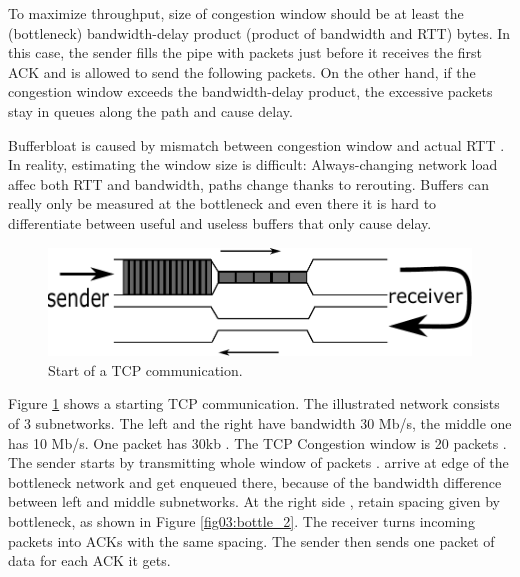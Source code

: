 To maximize throughput, size of congestion window should be at least the (bottleneck) bandwidth-delay product (product of bandwidth and RTT) bytes.  In this  case, the sender fills the pipe with packets just before it receives the first ACK and is allowed to send the following packets. On the other hand, if the congestion window exceeds the bandwidth-delay product, the excessive packets stay in queues along the path and cause delay. 


Bufferbloat is caused by  mismatch between  congestion window and actual RTT \cite{CoDel}. In reality, estimating the window size is difficult: Always-changing network load affec both RTT and bandwidth,  paths change thanks to  rerouting. Buffers can really only be measured at the bottleneck and even there it is hard to differentiate between useful and useless buffers that only cause delay. 

\begin{figure}
	\centering
	\includegraphics[width=137mm]{drawings/tcp_bottleneck_1}
	\caption{Start of a TCP communication.}
	\label{fig02:bottle_1}
\end{figure}

Figure \ref{fig02:bottle_1} shows a starting TCP communication. The illustrated network consists of 3 subnetworks. The left and the right have bandwidth 30 Mb/s, the middle one has 10 Mb/s. One packet has 30kb . The TCP Congestion window is  20 packets . The sender starts by transmitting whole window of packets .  arrive at edge of the bottleneck network and get enqueued there, because of the bandwidth difference between left and middle subnetworks.  At the right side ,   retain spacing given by  bottleneck, as shown in Figure \ref{fig03:bottle_2}. The receiver turns incoming packets into ACKs with the same spacing. The sender then sends one packet of data for each ACK it gets.

